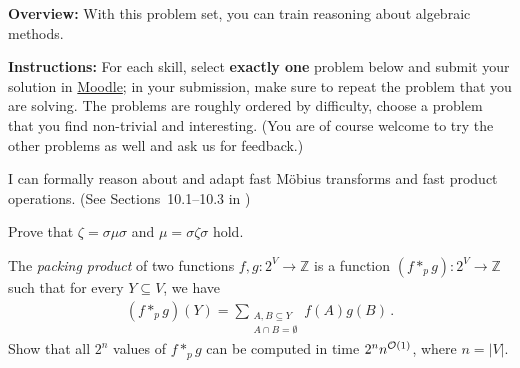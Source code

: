 \documentclass[english]{uebung_cs}
\begin{document}
\textbf{Overview:} With this problem set, you can train reasoning about algebraic methods.

\textbf{Instructions:} For each skill, select \textbf{exactly one} problem below and submit your solution in \href{https://moodle.studiumdigitale.uni-frankfurt.de/moodle/course/view.php?id=6259}{Moodle}; in your submission, make sure to repeat the problem that you are solving.
The problems are roughly ordered by difficulty, choose a problem that you find non-trivial and interesting. (You are of course welcome to try the other problems as well and ask us for feedback.)

\begin{skill}
  I can formally reason about and adapt fast Möbius transforms and fast product operations. \normalfont (See Sections~10.1--10.3 in \cygan{})
\end{skill}

\begin{exercise}
  Prove that $\zeta = \sigma \mu \sigma$ and $\mu = \sigma \zeta \sigma$ hold.
\end{exercise}

\begin{exercise}
  The \emph{packing product} of two functions \( f,g \colon 2^V \to \mathbb{Z} \) is a function \( (f \ast_p g) \colon 2^V \to \mathbb{Z} \) such that for every \( Y \subseteq V \), we have
  \begin{align*}
    (f \ast_p g)(Y) = \sum_{\substack{A,B \subseteq Y \\A\cap B =\emptyset}} f(A) g(B) \,.
  \end{align*}
  Show that all \( 2^{n} \) values of \( f \ast_p g \) can be computed in time \( 2^n n^{\mathcal{O}(1)} \), where \( n = |V| \).
\end{exercise}
\end{document}
